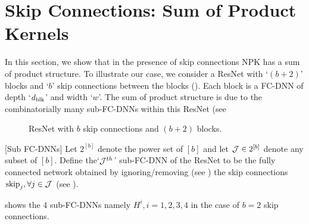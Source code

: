 \section{Skip Connections: Sum of Product Kernels}
In this section, we show that in the presence of skip connections NPK has a sum of product structure. To illustrate our case, we consider a ResNet with `$(b+2)$' blocks and `$b$' skip connections between the blocks (). Each block is a FC-DNN of depth `$d_{\text{blk}}$' and width `$w$'. The sum of product structure is due to the combinatorially many sub-FC-DNNs within this ResNet (see 
\FloatBarrier
\begin{figure}[h]
\caption{ResNet with $b$ skip connections and $(b+2)$ blocks.}
\label{fig:resnet}
\end{figure}
\begin{definition}\label{def:subfcdnn}[Sub FC-DNNs]
Let $2^{[b]}$ denote the power set of $[b]$ and let $\mathcal{J}\in 2^{[b]}$ denote any subset of $[b]$. Define the`$\mathcal{J}^{th}$' sub-FC-DNN of the ResNet to be the fully connected network obtained by ignoring/removing (see ) the skip connections $\text{skip}_j,\forall j\in \mathcal{J}$ (see ).
\end{definition}
 shows the $4$ sub-FC-DNNs namely $H^i,i=1,2,3,4$ in the case of $b=2$ skip connections.
\FloatBarrier
